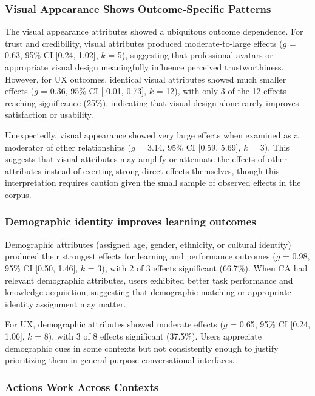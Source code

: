 \documentclass[manuscript,screen,review,anonymous]{acmart}
\begin{document}
\subsubsection{Visual Appearance Shows Outcome-Specific Patterns}

The visual appearance attributes showed a ubiquitous outcome dependence. For trust and credibility, visual attributes produced moderate-to-large effects ($g$ = 0.63, 95\% CI [0.24, 1.02], $k$ = 5), suggesting that professional avatars or appropriate visual design meaningfully influence perceived trustworthiness. However, for UX outcomes, identical visual attributes showed much smaller effects ($g$ = 0.36, 95\% CI [-0.01, 0.73], $k$ = 12), with only 3 of the 12 effects reaching significance (25\%), indicating that visual design alone rarely improves satisfaction or usability.

Unexpectedly, visual appearance showed very large effects when examined as a moderator of other relationships ($g$ = 3.14, 95\% CI [0.59, 5.69], $k$ = 3). This suggests that visual attributes may amplify or attenuate the effects of other attributes instead of exerting strong direct effects themselves, though this interpretation requires caution given the small sample of observed effects in the corpus.

\subsubsection{Demographic identity improves learning outcomes}

Demographic attributes (assigned age, gender, ethnicity, or cultural identity) produced their strongest effects for learning and performance outcomes ($g$ = 0.98, 95\% CI [0.50, 1.46], $k$ = 3), with 2 of 3 effects significant (66.7\%). When CA had relevant demographic attributes, users exhibited better task performance and knowledge acquisition, suggesting that demographic matching or appropriate identity assignment may matter.

For UX, demographic attributes showed moderate effects ($g$ = 0.65, 95\% CI [0.24, 1.06], $k$ = 8), with 3 of 8 effects significant (37.5\%). Users appreciate demographic cues in some contexts but not consistently enough to justify prioritizing them in general-purpose conversational interfaces.

\subsubsection{Actions Work Across Contexts}
\end{document}
